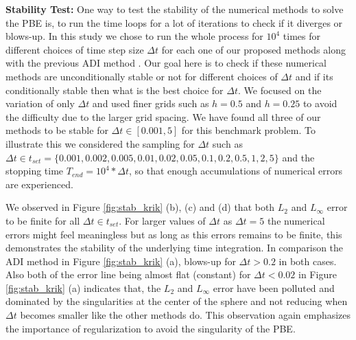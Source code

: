 \textbf{Stability Test:} One way to test the stability of the numerical methods to solve the PBE is, to run the time loops for a lot of iterations to check if it diverges or blows-up. In this study we chose to run the whole process for $10^4$ times for different choices of time step size $\Delta t$ for each one of our proposed  methods along with the previous ADI method \cite{Geng2013_Fully}. Our goal here is to check if these numerical methods are unconditionally stable or not for different choices of $\Delta t$ and if its conditionally stable then what is the best choice for $\Delta t$. We focused on the variation of only $\Delta t$ and used finer grids such as $h = 0.5$ and $h = 0.25$ to avoid the difficulty due to the larger grid spacing. We have found all three of our methods to be stable for $\Delta t \in [0.001,5]$ for this benchmark problem. To illustrate this we considered the sampling for $\Delta t $ such as $\Delta t \in t_{set}=\{0.001, 0.002, 0.005,0.01, 0.02, 0.05, 0.1, 0.2, 0.5, 1,2,5\}$ and the stopping time $T_{end}= 10^4*\Delta t$, so that enough accumulations of numerical errors are experienced. 

We observed in Figure \ref{fig:stab_krik} (b), (c) and (d) that both $L_2$ and $L_\infty$ error to be finite for all $\Delta t \in t_{set}$. For larger values of $\Delta t$ as $\Delta t =5$ the numerical errors might feel meaningless but as long as this errors remains to be finite, this demonstrates the stability of the underlying time integration.  In comparison the ADI method \cite{Geng2013_Fully} in Figure \ref{fig:stab_krik} (a), blows-up for $\Delta t > 0.2$ in both cases. Also both of the error line being almost flat (constant) for $\Delta t <0.02$ in Figure \ref{fig:stab_krik} (a) indicates that, the $L_2$ and $L_\infty$ error have been polluted and dominated by the singularities at the center of the sphere and not reducing when $\Delta t$ becomes smaller like the other methods do. This observation again emphasizes the importance of regularization to avoid the singularity of the PBE. 


